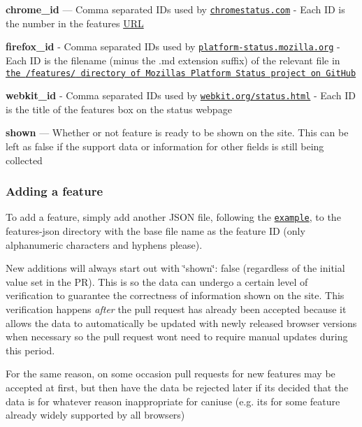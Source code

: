 \begin{DoxyItemize}
\item {\bfseries chrome\+\_\+id} — Comma separated I\+Ds used by \href{http://chromestatus.com}{\tt chromestatus.\+com} -\/ Each ID is the number in the feature\textquotesingle{}s \mbox{\hyperlink{namespace_u_r_l}{U\+RL}}
\item {\bfseries firefox\+\_\+id} -\/ Comma separated I\+Ds used by \href{https://platform-status.mozilla.org/}{\tt platform-\/status.\+mozilla.\+org} -\/ Each ID is the filename (minus the {\ttfamily .md} extension suffix) of the relevant file in \href{https://github.com/mozilla/platform-status/tree/master/features}{\tt the {\ttfamily /features/} directory of Mozilla\textquotesingle{}s Platform Status project on Git\+Hub}
\item {\bfseries webkit\+\_\+id} -\/ Comma separated I\+Ds used by \href{http://www.webkit.org/status.html}{\tt webkit.\+org/status.html} -\/ Each ID is the title of the feature\textquotesingle{}s box on the status webpage
\item {\bfseries shown} — Whether or not feature is ready to be shown on the site. This can be left as false if the support data or information for other fields is still being collected
\end{DoxyItemize}

\subsubsection*{Adding a feature}

To add a feature, simply add another J\+S\+ON file, following the \href{/sample-data.json}{\tt example}, to the {\ttfamily features-\/json} directory with the base file name as the feature ID (only alphanumeric characters and hyphens please).

New additions will always start out with {\ttfamily \char`\"{}shown\char`\"{}\+: false} (regardless of the initial value set in the PR). This is so the data can undergo a certain level of verification to guarantee the correctness of information shown on the site. This verification happens {\itshape after} the pull request has already been accepted because it allows the data to automatically be updated with newly released browser versions when necessary so the pull request won\textquotesingle{}t need to require manual updates during this period.

For the same reason, on some occasion pull requests for new features may be accepted at first, but then have the data be rejected later if it\textquotesingle{}s decided that the data is for whatever reason inappropriate for caniuse (e.\+g. it\textquotesingle{}s for some feature already widely supported by all browsers)


